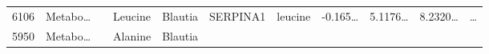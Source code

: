 \documentclass[
]{article}
\begin{document}
\begin{longtable}[]{@{}lllllllllll@{}}
\begin{minipage}[t]{0.05\columnwidth}
6106\strut
\end{minipage} & \begin{minipage}[t]{0.07\columnwidth}\raggedright
Metabo\ldots{}\strut
\end{minipage} & \begin{minipage}[t]{0.07\columnwidth}\raggedright
\strut
\end{minipage} & \begin{minipage}[t]{0.09\columnwidth}\raggedright
Leucine\strut
\end{minipage} & \begin{minipage}[t]{0.07\columnwidth}\raggedright
Blautia\strut
\end{minipage} & \begin{minipage}[t]{0.07\columnwidth}\raggedright
SERPINA1\strut
\end{minipage} & \begin{minipage}[t]{0.09\columnwidth}\raggedright
leucine\strut
\end{minipage} & \begin{minipage}[t]{0.07\columnwidth}\raggedright
-0.165\ldots{}\strut
\end{minipage} & \begin{minipage}[t]{0.07\columnwidth}\raggedright
5.1176\ldots{}\strut
\end{minipage} & \begin{minipage}[t]{0.07\columnwidth}\raggedright
8.2320\ldots{}\strut
\end{minipage} & \begin{minipage}[t]{0.03\columnwidth}\raggedright
\ldots{}\strut
\end{minipage}\tabularnewline
\begin{minipage}[t]{0.05\columnwidth}\raggedright
5950\strut
\end{minipage} & \begin{minipage}[t]{0.07\columnwidth}\raggedright
Metabo\ldots{}\strut
\end{minipage} & \begin{minipage}[t]{0.07\columnwidth}\raggedright
\strut
\end{minipage} & \begin{minipage}[t]{0.09\columnwidth}\raggedright
Alanine\strut
\end{minipage} & \begin{minipage}[t]{0.07\columnwidth}\raggedright
Blautia\strut
\end{minipage} & \begin{minipage}[t]{0.07\columnwidth}\raggedright

\end{minipage}
\end{longtable}
\end{document}
